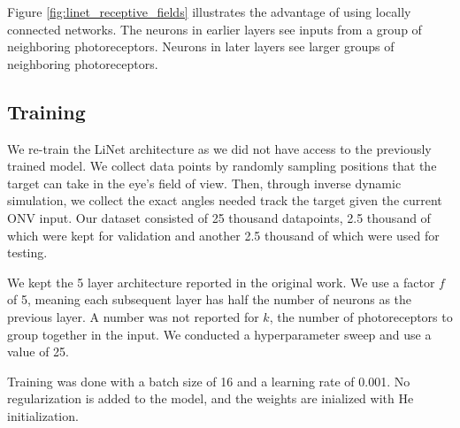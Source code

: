 \documentclass[../taasin.tex]{subfiles}
\begin{document}
Figure \ref{fig:linet_receptive_fields} illustrates the advantage of using locally connected networks. The neurons in earlier layers see inputs from a group of neighboring photoreceptors. Neurons in later layers see larger groups of neighboring photoreceptors.



\subsection{Training}

We re-train the LiNet architecture as we did not have access to the previously trained model. We collect data points by randomly sampling positions that the target can take in the eye's field of view. Then, through inverse dynamic simulation, we collect the exact angles needed track the target given the current ONV input. Our dataset consisted of 25 thousand datapoints, 2.5 thousand of which were kept for validation and another 2.5 thousand of which were used for testing. 

We kept the 5 layer architecture reported in the original work. We use a factor $f$ of 5, meaning each subsequent layer has half the number of neurons as the previous layer. A number was not reported for $k$, the number of photoreceptors to group together in the input. We conducted a hyperparameter sweep and use a value of 25.

Training was done with a batch size of 16 and a learning rate of 0.001. No regularization is added to the model, and the weights are inialized with He initialization.

\end{document}
